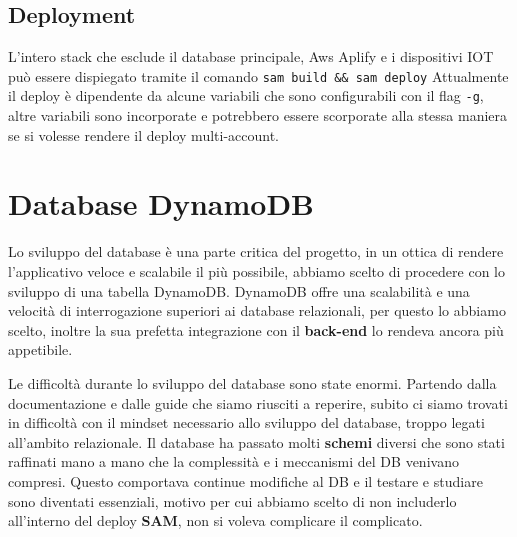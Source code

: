 \subsection{Deployment} 
        L'intero stack che esclude il database principale, Aws Aplify e i dispositivi IOT può essere dispiegato tramite il comando \texttt{sam build \&\& sam deploy}
        Attualmente il deploy è dipendente da alcune variabili che sono configurabili con il flag \texttt{-g}, altre variabili sono incorporate e potrebbero essere scorporate alla stessa maniera se si volesse rendere il deploy multi-account.
        
\section{Database DynamoDB}
        Lo sviluppo del database è una parte critica del progetto,
        in un ottica di rendere l'applicativo veloce e scalabile il più possibile, abbiamo scelto di procedere con lo sviluppo di una tabella DynamoDB.
        DynamoDB offre una scalabilità e una velocità di interrogazione superiori ai database relazionali, per questo lo abbiamo scelto, inoltre la sua prefetta integrazione con il \textbf{back-end} lo rendeva ancora più appetibile.
        
        Le difficoltà durante lo sviluppo del database sono state enormi.
        Partendo dalla documentazione e dalle guide che siamo riusciti a reperire, subito ci siamo trovati in difficoltà con il mindset necessario allo sviluppo del database, troppo legati all'ambito relazionale.
        Il database ha passato molti \textbf{schemi} diversi che sono stati raffinati mano a mano che la complessità e i meccanismi del DB venivano compresi.
        Questo comportava continue modifiche al DB e il testare e studiare sono diventati essenziali, motivo per cui abbiamo scelto di non includerlo all'interno del deploy \textbf{SAM}, non si voleva complicare il complicato.
        
